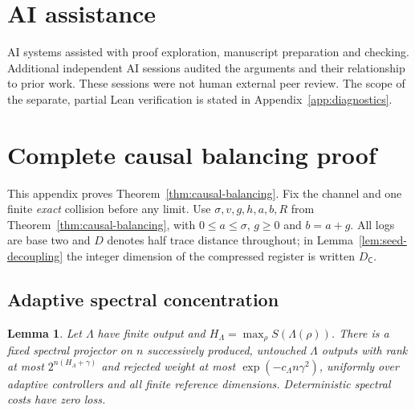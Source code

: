 \documentclass[11pt,a4paper]{article}
\numberwithin{equation}{section}
\theoremstyle{plain}
\newtheorem{lemma}[theorem]{Lemma}
\theoremstyle{definition}
\newcommand{\rg}[1]{\mathsf{#1}}
\newcommand{\Dist}{D}                      %
\begin{document}
\section*{AI assistance}

AI systems assisted with proof exploration, manuscript preparation and checking.
Additional independent AI sessions audited the arguments and their relationship
to prior work. These sessions were not human external peer review. The scope
of the separate, partial Lean verification is stated in Appendix~\ref{app:diagnostics}.

\appendix

\section{Complete causal balancing proof}
\label{app:balancing}

This appendix proves Theorem~\ref{thm:causal-balancing}. Fix the channel and
one finite \emph{exact} collision before any limit. Use
$\sigma,v,g,h,a,b,R$ from Theorem~\ref{thm:causal-balancing}, with
$0\le a\le\sigma$, $g\ge 0$ and $b=a+g$. All logs are base two and $\Dist$
denotes half trace distance throughout; in Lemma~\ref{lem:seed-decoupling}
the integer dimension of the compressed register is written $D_{\rg{C}}$.

\subsection{Adaptive spectral concentration}

\begin{lemma}
\label{lem:adaptive-projector}
Let $\Lambda$ have finite output and $H_\Lambda=\max_\rho S(\Lambda(\rho))$.
There is a fixed spectral projector on $n$ successively produced, untouched
$\Lambda$ outputs with rank at most $2^{n(H_\Lambda+\gamma)}$ and rejected
weight at most $\exp(-c_\Lambda n\gamma^2)$, uniformly over adaptive
controllers and all finite reference dimensions. Deterministic spectral costs
have zero loss.
\end{lemma}
\end{document}
